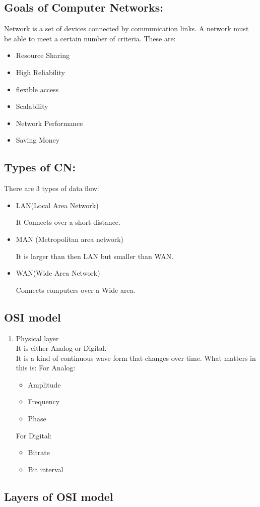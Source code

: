 \documentclass[11pt,letterpaper]{article}
\begin{document}
\subsection{Goals of Computer Networks:}
Network is a set of devices connected by communication links. A network must be able to meet a certain number of criteria. These are:
\begin{itemize}
  \item Resource Sharing
  \item High Reliability
  \item flexible access
  \item Scalability
  \item Network Performance
  \item Saving Money
\end{itemize}

\subsection{Types of CN:}
There are 3 types of data flow: 
\begin{itemize}
\item LAN(Local Area Network)
 	
  It Connects over a short distance.
\item MAN (Metropolitan area network)
  
 It is larger than then LAN but smaller than WAN.
\item WAN(Wide Area Network)
	
  Connects computers over a Wide area. 
\end{itemize}

\subsection{OSI model}
\begin{enumerate}
  \item Physical layer\\
    It is either Analog or Digital.\\
    It is a kind of continuous wave form that changes over time. 
    What matters in this is:
    For Analog:
    \begin{itemize}
      \item Amplitude
      \item Frequency
      \item Phase
    \end{itemize}
    For Digital:
    \begin{itemize}
      \item Bitrate
      \item Bit interval
    \end{itemize}
\end{enumerate}

\subsection{Layers of OSI model}
\end{document}
